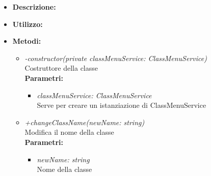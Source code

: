 \begin{itemize}
	\item \textbf{Descrizione:}\\
	
	\item \textbf{Utilizzo:}\\
	
	\item \textbf{Metodi:}
		\begin{itemize}
			\item \emph{-constructor(private classMenuService: ClassMenuService)}\\
    		Costruttore della classe\\
    		\textbf{Parametri:}
    		\begin{itemize}
    			\item \emph{classMenuService: ClassMenuService}\\
    			Serve per creare un istanziazione di ClassMenuService
    		\end{itemize}
    		\item \emph{+changeClassName(newName: string)}\\
    		Modifica il nome della classe\\
    		\textbf{Parametri:}
    		\begin{itemize}
    			\item \emph{newName: string}\\
    			Nome della classe
    		\end{itemize}
		\end{itemize}
\end{itemize}